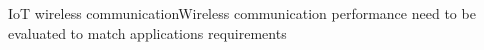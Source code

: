 



\begin{frame}{IoT wireless communication}{Wireless communication performance need to be evaluated to match applications requirements}
\end{frame}

